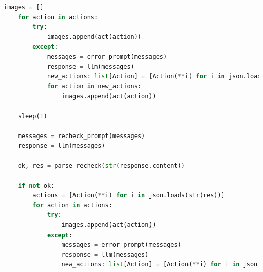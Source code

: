 \documentclass{article}
\begin{document}
\begin{lstlisting}[language=Python]
    images = []
    for action in actions:
        try:
            images.append(act(action))
        except:
            messages = error_prompt(messages)
            response = llm(messages)
            new_actions: list[Action] = [Action(**i) for i in json.loads(str(response.content))]
            for action in new_actions:
                images.append(act(action))
        
    sleep(1)
        
    messages = recheck_prompt(messages)
    response = llm(messages)
    
    ok, res = parse_recheck(str(response.content))
    
    if not ok:
        actions = [Action(**i) for i in json.loads(str(res))]
        for action in actions:
            try:
                images.append(act(action))
            except:
                messages = error_prompt(messages)
                response = llm(messages)
                new_actions: list[Action] = [Action(**i) for i in json.loads(str(response.content))]
\end{lstlisting}
\end{document}
